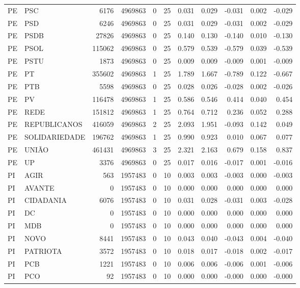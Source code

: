 \begin{landscape}
\begin{longtable}{llrrrrrrrrr}
PE & PSC & 6176 & 4969863 & 0 & 25 & 0.031 & 0.029 & -0.031 & 0.002 & -0.029 \\
PE & PSD & 6246 & 4969863 & 0 & 25 & 0.031 & 0.029 & -0.031 & 0.002 & -0.029 \\
PE & PSDB & 27826 & 4969863 & 0 & 25 & 0.140 & 0.130 & -0.140 & 0.010 & -0.130 \\
PE & PSOL & 115062 & 4969863 & 0 & 25 & 0.579 & 0.539 & -0.579 & 0.039 & -0.539 \\
PE & PSTU & 1873 & 4969863 & 0 & 25 & 0.009 & 0.009 & -0.009 & 0.001 & -0.009 \\
PE & PT & 355602 & 4969863 & 1 & 25 & 1.789 & 1.667 & -0.789 & 0.122 & -0.667 \\
PE & PTB & 5598 & 4969863 & 0 & 25 & 0.028 & 0.026 & -0.028 & 0.002 & -0.026 \\
PE & PV & 116478 & 4969863 & 1 & 25 & 0.586 & 0.546 & 0.414 & 0.040 & 0.454 \\
PE & REDE & 151812 & 4969863 & 1 & 25 & 0.764 & 0.712 & 0.236 & 0.052 & 0.288 \\
PE & REPUBLICANOS & 416059 & 4969863 & 2 & 25 & 2.093 & 1.951 & -0.093 & 0.142 & 0.049 \\
PE & SOLIDARIEDADE & 196762 & 4969863 & 1 & 25 & 0.990 & 0.923 & 0.010 & 0.067 & 0.077 \\
PE & UNIÃO & 461431 & 4969863 & 3 & 25 & 2.321 & 2.163 & 0.679 & 0.158 & 0.837 \\
PE & UP & 3376 & 4969863 & 0 & 25 & 0.017 & 0.016 & -0.017 & 0.001 & -0.016 \\
PI & AGIR & 563 & 1957483 & 0 & 10 & 0.003 & 0.003 & -0.003 & 0.000 & -0.003 \\
PI & AVANTE & 0 & 1957483 & 0 & 10 & 0.000 & 0.000 & 0.000 & 0.000 & 0.000 \\
PI & CIDADANIA & 6076 & 1957483 & 0 & 10 & 0.031 & 0.028 & -0.031 & 0.003 & -0.028 \\
PI & DC & 0 & 1957483 & 0 & 10 & 0.000 & 0.000 & 0.000 & 0.000 & 0.000 \\
PI & MDB & 0 & 1957483 & 0 & 10 & 0.000 & 0.000 & 0.000 & 0.000 & 0.000 \\
PI & NOVO & 8441 & 1957483 & 0 & 10 & 0.043 & 0.040 & -0.043 & 0.004 & -0.040 \\
PI & PATRIOTA & 3572 & 1957483 & 0 & 10 & 0.018 & 0.017 & -0.018 & 0.002 & -0.017 \\
PI & PCB & 1221 & 1957483 & 0 & 10 & 0.006 & 0.006 & -0.006 & 0.001 & -0.006 \\
PI & PCO & 92 & 1957483 & 0 & 10 & 0.000 & 0.000 & -0.000 & 0.000 & -0.000 \\

\end{longtable}
\end{landscape}

